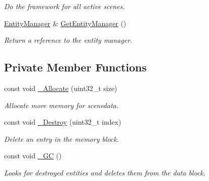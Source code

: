 \begin{DoxyCompactItemize}
\begin{DoxyCompactList}\small\item\em Do the framework for all active scenes. \end{DoxyCompactList}\item 
\hyperlink{class_ensum_1_1_components_1_1_entity_manager}{Entity\+Manager} \& \hyperlink{class_ensum_1_1_components_1_1_scene_manager_a7fdc5d47c5b8fe03807fe472b038a56f}{Get\+Entity\+Manager} ()\hypertarget{class_ensum_1_1_components_1_1_scene_manager_a7fdc5d47c5b8fe03807fe472b038a56f}{}\label{class_ensum_1_1_components_1_1_scene_manager_a7fdc5d47c5b8fe03807fe472b038a56f}

\begin{DoxyCompactList}\small\item\em Return a reference to the entity manager. \end{DoxyCompactList}\end{DoxyCompactItemize}
\subsection*{Private Member Functions}
\begin{DoxyCompactItemize}
\item 
const void \hyperlink{class_ensum_1_1_components_1_1_scene_manager_a383a468319c93280ce8ac0bbb920ab87}{\+\_\+\+Allocate} (uint32\+\_\+t size)
\begin{DoxyCompactList}\small\item\em Allocate more memory for scenedata. \end{DoxyCompactList}\item 
const void \hyperlink{class_ensum_1_1_components_1_1_scene_manager_a8102cfd9f4fed62a06e564dc016b6c46}{\+\_\+\+Destroy} (uint32\+\_\+t index)
\begin{DoxyCompactList}\small\item\em Delete an entry in the memory block. \end{DoxyCompactList}\item 
const void \hyperlink{class_ensum_1_1_components_1_1_scene_manager_a156f50b0273598415c52dabae19ae334}{\+\_\+\+GC} ()\hypertarget{class_ensum_1_1_components_1_1_scene_manager_a156f50b0273598415c52dabae19ae334}{}\label{class_ensum_1_1_components_1_1_scene_manager_a156f50b0273598415c52dabae19ae334}

\begin{DoxyCompactList}\small\item\em Looks for destroyed entities and deletes them from the data block. \end{DoxyCompactList}\end{DoxyCompactItemize}
